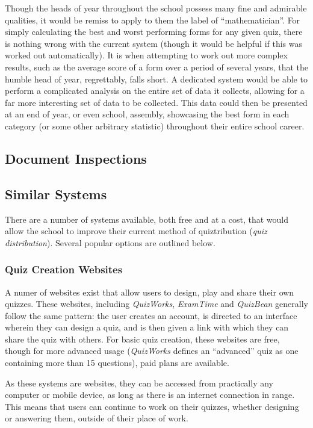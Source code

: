 Though the heads of year throughout the school possess many fine and admirable qualities, it would be remiss to apply to them the label of ``mathematician''.  For simply calculating the best and worst performing forms for any given quiz, there is nothing wrong with the current system (though it would be helpful if this was worked out automatically). It is when attempting to work out more complex results, such as the average score of a form over a period of several years, that the humble head of year, regrettably, falls short. A dedicated system would be able to perform a complicated analysis on the entire set of data it collects, allowing for a far more interesting set of data to be collected. This data could then be presented at an end of year, or even school, assembly, showcasing the best form in each category (or some other arbitrary statistic) throughout their entire school career.

\subsection{Document Inspections}

\subsection{Similar Systems}
There are a number of systems available, both free and at a cost, that would allow the school to improve their current method of quiztribution (\textit{quiz distribution}). Several popular options are outlined below.

\subsubsection{Quiz Creation Websites}
A numer of websites exist that allow users to design, play and share their own quizzes. These websites, including \textit{QuizWorks}, \textit{ExamTime} and \textit{QuizBean} generally follow the same pattern: the user creates an account, is directed to an interface wherein they can design a quiz, and is then given a link with which they can share the quiz with others. For basic quiz creation, these websites are free, though for more advanced usage (\textit{QuizWorks} defines an ``advanced'' quiz as one containing more than 15 questions), paid plans are available.

As these systems are websites, they can be accessed from practically any computer or mobile device, as long as there is an internet connection in range. This means that users can continue to work on their quizzes, whether designing or answering them, outside of their place of work.


